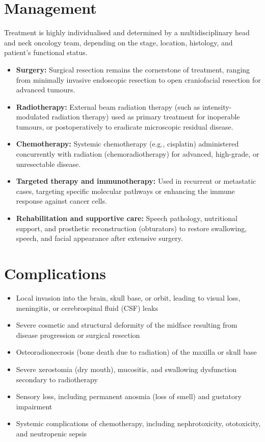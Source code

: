 \section*{Management}
Treatment is highly individualised and determined by a multidisciplinary head and neck oncology team, depending on the stage, location, histology, and patient's functional status.
\begin{itemize}
    \item \textbf{Surgery:} Surgical resection remains the cornerstone of treatment, ranging from minimally invasive endoscopic resection to open craniofacial resection for advanced tumours.
    \item \textbf{Radiotherapy:} External beam radiation therapy (such as intensity-modulated radiation therapy) used as primary treatment for inoperable tumours, or postoperatively to eradicate microscopic residual disease.
    \item \textbf{Chemotherapy:} Systemic chemotherapy (e.g., cisplatin) administered concurrently with radiation (chemoradiotherapy) for advanced, high-grade, or unresectable disease.
    \item \textbf{Targeted therapy and immunotherapy:} Used in recurrent or metastatic cases, targeting specific molecular pathways or enhancing the immune response against cancer cells.
    \item \textbf{Rehabilitation and supportive care:} Speech pathology, nutritional support, and prosthetic reconstruction (obturators) to restore swallowing, speech, and facial appearance after extensive surgery.
\end{itemize}

\section*{Complications}
\begin{itemize}
    \item Local invasion into the brain, skull base, or orbit, leading to visual loss, meningitis, or cerebrospinal fluid (CSF) leaks
    \item Severe cosmetic and structural deformity of the midface resulting from disease progression or surgical resection
    \item Osteoradionecrosis (bone death due to radiation) of the maxilla or skull base
    \item Severe xerostomia (dry mouth), mucositis, and swallowing dysfunction secondary to radiotherapy
    \item Sensory loss, including permanent anosmia (loss of smell) and gustatory impairment
    \item Systemic complications of chemotherapy, including nephrotoxicity, ototoxicity, and neutropenic sepsis
\end{itemize}

